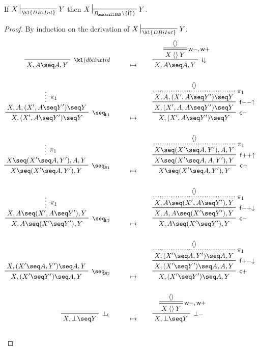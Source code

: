 \begin{lemma}
  
  If $X \prov{\kl{DBiInt}} Y$ then $X \prov{\sysBHB \setminus
  \{\rsf{i{\ua}}\}} Y$.
\end{lemma}
\begin{proof}
  By induction on the derivation of $X \prov{\kl{DBiInt}} Y$. 
  \begin{align*}
    \R[\kl(dbiint){id}]
      {}
      {X, A \seq A, Y}
    &\mt
    \R[\rsf{i{\da}}]
    {\prftree[r][d]{\rsf{w{-},w{+}}}
    {\piq{}}
    {X \piq{} Y}}
    {X, A \seq A, Y}
    \\\\
    \R[\rsf{\seq_{L1}}]
      {\summ[$\pi_1$]{X, A, (X', A \seq Y') \seq Y}}
      {X, (X', A \seq Y') \seq Y}
    &\mt
    \R[\rsf{c{-}}]
    {\R[\rsf{f{-}{-}{\ua}}]
    {\prftree[r][dotted]{$\pi_1$}
    {\piq{}}
    {X, A, (X', A \seq Y') \seq Y}}
    {X, (X', A, A \seq Y') \seq Y}}
    {X, (X', A \seq Y') \seq Y}
    \\\\
    \R[\rsf{\seq_{R1}}]
      {\summ[$\pi_1$]{X \seq  (X' \seq A, Y'), A, Y}}
      {X \seq (X' \seq A, Y'), Y}
    &\mt
    \R[\rsf{c{+}}]
    {\R[\rsf{f{+}{+}{\ua}}]
    {\prftree[r][dotted]{$\pi_1$}
    {\piq{}}
    {X \seq (X' \seq A, Y'), A, Y}}
    {X \seq (X' \seq A, A, Y'), Y}}
    {X \seq (X' \seq A, Y'), Y}
    \\\\
    \R[\rsf{\seq_{L2}}]
      {\summ[$\pi_1$]{X, A \seq (X', A \seq Y'), Y}}
      {X, A \seq (X' \seq Y'), Y}
    &\mt
    \R[\rsf{c{-}}]
    {\R[\rsf{f{-}{+}{\da}}]
    {\prftree[r][dotted]{$\pi_1$}
    {\piq{}}
    {X, A \seq (X', A \seq Y'), Y}}
    {X, A, A \seq (X' \seq Y'), Y}}
    {X, A \seq (X' \seq Y'), Y}
    \\\\
    \R[\rsf{\seq_{R2}}]
      {X, (X' \seq A, Y') \seq A, Y}
      {X, (X' \seq Y') \seq A, Y}
    &\mt
    \R[\rsf{c{+}}]
    {\R[\rsf{f{+}{-}{\da}}]
    {\prftree[r][dotted]{$\pi_1$}
    {\piq{}}
    {X, (X' \seq A, Y') \seq A, Y}}
    {X, (X' \seq Y') \seq A, A, Y}}
    {X, (X' \seq Y') \seq A, Y}
    \\\\
    \R[\rsf{\bot_L}]
      {}
      {X, \bot \seq Y}
    &\mt
    \R[\rsf{\bot{-}}]
    {\prftree[r][d]{\rsf{w{-},w{+}}}
    {\piq{}}
    {X \piq{} Y}}
    {X, \bot \seq Y}
    \\\\

\end{align*}
\end{proof}
